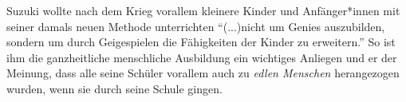 Suzuki wollte nach dem Krieg vorallem kleinere Kinder und Anfänger*innen mit
seiner damals neuen Methode unterrichten \enquote{(...)nicht um Genies
auszubilden, sondern um durch Geigespielen die Fähigkeiten der Kinder zu
erweitern.} \autocite[43]{suzuki:erziehung_ist_liebe} So ist ihm die
ganzheitliche menschliche Ausbildung ein wichtiges Anliegen und er der Meinung,
dass alle seine Schüler vorallem auch zu \emph{edlen Menschen} herangezogen
wurden, wenn sie durch seine Schule gingen. 










